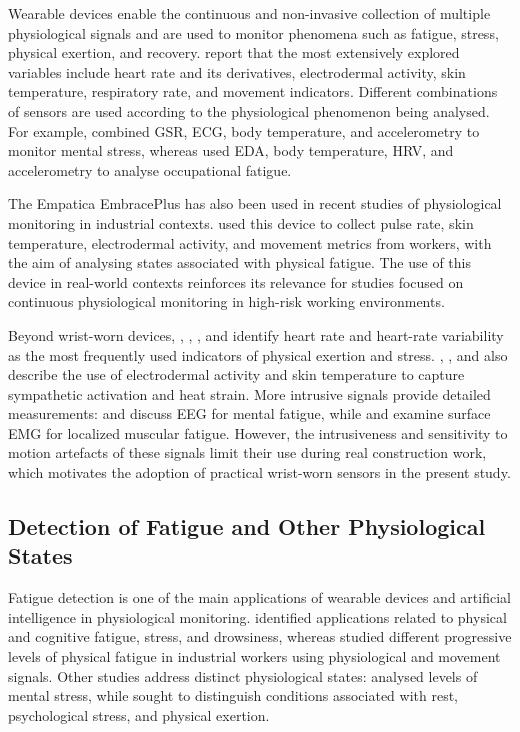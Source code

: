 \documentclass[a4paper,fleqn]{cas-sc}
\newcommand{\newtextgreen}[1]{{\color{green!60!black}#1}}
\begin{document}
Wearable devices enable the continuous and non-invasive collection of multiple physiological signals and are used to monitor phenomena such as fatigue, stress, physical exertion, and recovery. \citet{kakhi2025} report that the most extensively explored variables include heart rate and its derivatives, electrodermal activity, skin temperature, respiratory rate, and movement indicators. Different combinations of sensors are used according to the physiological phenomenon being analysed. For example, \citet{thomas2025} combined GSR, ECG, body temperature, and accelerometry to monitor mental stress, whereas \citet{goutham2025} used EDA, body temperature, HRV, and accelerometry to analyse occupational fatigue.

The Empatica EmbracePlus has also been used in recent studies of physiological monitoring in industrial contexts. \citet{albarran2025} used this device to collect pulse rate, skin temperature, electrodermal activity, and movement metrics from workers, with the aim of analysing states associated with physical fatigue. The use of this device in real-world contexts reinforces its relevance for studies focused on continuous physiological monitoring in high-risk working environments.

\newtextgreen{Beyond wrist-worn devices, \citet{fasoyinu2025}, \citet{wang2024}, \citet{sim2023}, and \citet{thomas2025} identify heart rate and heart-rate variability as the most frequently used indicators of physical exertion and stress. \citet{umer2025}, \citet{ojha2024}, and \citet{albarran2025} also describe the use of electrodermal activity and skin temperature to capture sympathetic activation and heat strain. More intrusive signals provide detailed measurements: \citet{cheng2025} and \citet{kakhi2025} discuss EEG for mental fatigue, while \citet{anjum2025} and \citet{karim2025} examine surface EMG for localized muscular fatigue. However, the intrusiveness and sensitivity to motion artefacts of these signals limit their use during real construction work, which motivates the adoption of practical wrist-worn sensors in the present study.}

\subsection{Detection of Fatigue and Other Physiological States}

Fatigue detection is one of the main applications of wearable devices and artificial intelligence in physiological monitoring. \citet{kakhi2025} identified applications related to physical and cognitive fatigue, stress, and drowsiness, whereas \citet{albarran2025} studied different progressive levels of physical fatigue in industrial workers using physiological and movement signals. Other studies address distinct physiological states: \citet{thomas2025} analysed levels of mental stress, while \citet{georgieva2025} sought to distinguish conditions associated with rest, psychological stress, and physical exertion.
\end{document}

